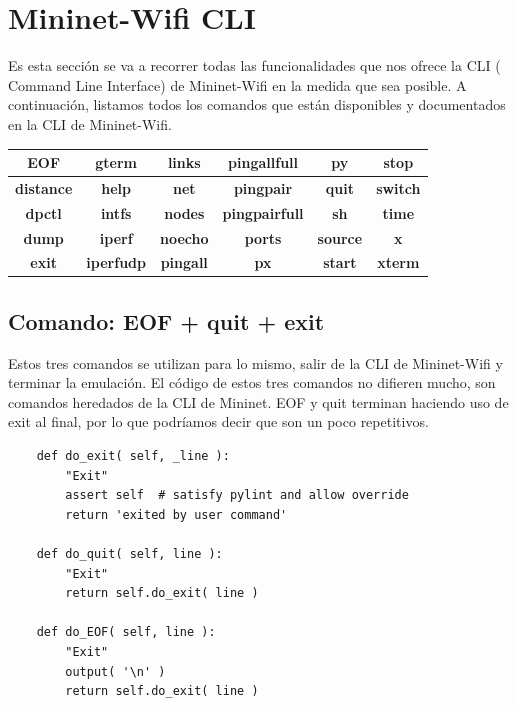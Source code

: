\section{Mininet-Wifi CLI}
Es esta sección se va a recorrer todas las funcionalidades que nos ofrece la CLI ( Command Line Interface) de Mininet-Wifi en la medida que sea posible. A continuación, listamos todos los comandos que están disponibles y documentados en la CLI de Mininet-Wifi. \newline
\newline

\begin{table}[!ht]
\centering
\begin{tabular}{|c|c|c|c|c|c|}
\hline
\textbf{EOF}      & \textbf{gterm}    & \textbf{links}   & \textbf{pingallfull}  & \textbf{py}     & \textbf{stop}   \\ \hline
\textbf{distance} & \textbf{help}     & \textbf{net}     & \textbf{pingpair}     & \textbf{quit}   & \textbf{switch} \\ \hline
\textbf{dpctl}    & \textbf{intfs}    & \textbf{nodes}   & \textbf{pingpairfull} & \textbf{sh}     & \textbf{time}   \\ \hline
\textbf{dump}     & \textbf{iperf}    & \textbf{noecho}  & \textbf{ports}        & \textbf{source} & \textbf{x}      \\ \hline
\textbf{exit}     & \textbf{iperfudp} & \textbf{pingall} & \textbf{px}           & \textbf{start}  & \textbf{xterm}  \\ \hline
\end{tabular}
\centering
\end{table}
\subsection{Comando: EOF + quit + exit}
Estos tres comandos se utilizan para lo mismo, salir de la CLI de Mininet-Wifi y terminar la emulación. El código de estos tres comandos no difieren mucho,  son comandos heredados de la CLI de Mininet. EOF y quit terminan haciendo uso de exit al final, por lo que podríamos decir que son un poco repetitivos.
\begin{verbatim}
    def do_exit( self, _line ):
        "Exit"
        assert self  # satisfy pylint and allow override
        return 'exited by user command'

    def do_quit( self, line ):
        "Exit"
        return self.do_exit( line )

    def do_EOF( self, line ):
        "Exit"
        output( '\n' )
        return self.do_exit( line )
\end{verbatim}
